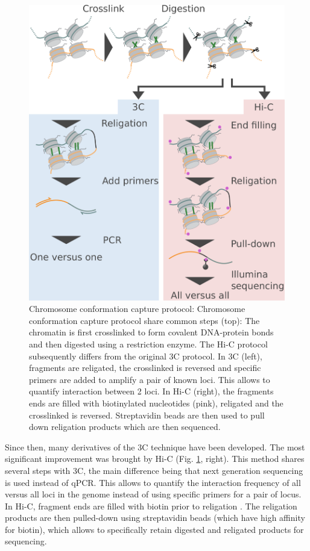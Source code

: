 \begin{figure}[htb]
    \includegraphics[width=\textwidth]{Parts/Part01/gfx/3c_protocol.pdf}
    \caption{Chromosome conformation capture protocol: Chromosome conformation capture protocol share common steps (top): The chromatin is first crosslinked to form covalent DNA-protein bonds and then digested using a restriction enzyme. The Hi-C protocol subsequently differs from the original 3C protocol. In 3C (left), fragments are religated, the crosslinked is reversed and specific primers are added to amplify a pair of known loci. This allows to quantify interaction between 2 loci. In Hi-C (right), the fragments ends are filled with biotinylated nucleotides (pink), religated and the crosslinked is reversed. Streptavidin beads are then used to pull down religation products which are then sequenced.}
	\label{fig:01-02:3c}
\end{figure}

Since then, many derivatives of the \acrshort{3C} technique have been developed. The most significant improvement was brought by Hi-C (Fig. \ref{fig:01-02:3c}, right). This method shares several steps with 3C, the main difference being that next generation sequencing is used instead of qPCR. This allows to quantify the interaction frequency of all versus all loci in the genome instead of using specific primers for a pair of locus. In Hi-C, fragment ends are filled with biotin prior to religation \cite{lieberman-aidenComprehensiveMappingLongRange2009}. The religation products are then pulled-down using streptavidin beads (which have high affinity for biotin), which allows to specifically retain digested  and religated products for sequencing.

